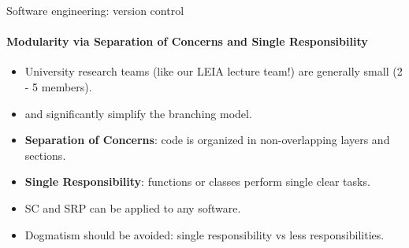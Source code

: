 \documentclass[
	aspectratio=169,%
	color={accentcolor=2d},
	logo=true,%
	colorframetitle=true,%
	]{tudabeamer}
\begin{document}
\begin{frame}{Software engineering: version control}
    \framesubtitle{Modularity via Separation of Concerns and Single Responsibility}

	\vfill
	\begin{itemize}

            \item University research teams (like our LEIA lecture team!) are generally small (2 - 5 members).
            \item \href{https://en.wikipedia.org/wiki/Separation_of_concerns}{} and \href{https://en.wikipedia.org/wiki/Single-responsibility_principle}{} significantly simplify the branching model. 

            \item \textbf{Separation of Concerns}: code is organized in non-overlapping layers and sections. 

            \item \textbf{Single Responsibility}: functions or classes perform single clear tasks.

            \item SC and SRP can be applied to any software.
            \item Dogmatism should be avoided: single responsibility vs less responsibilities. 
        \end{itemize}


\end{frame}
\end{document}
